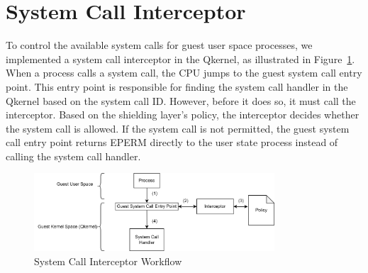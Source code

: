 \section{System Call Interceptor}
\label{sec:design_Interceptor}
To control the available system calls for guest user space processes, we implemented a system call interceptor in the Qkernel, as illustrated in Figure~\ref{fig:syscall_interceptor}. When a process calls a system call, the CPU jumps to the guest system call entry point. 
This entry point is responsible for finding the system call handler in the Qkernel based on the system call ID. However, before it does so, it must call the interceptor. Based on the shielding layer's policy, the interceptor decides whether the 
system call is allowed. If the system call is not permitted, the guest system call entry point returns EPERM directly to the user state process instead of calling the system call handler.

\begin{figure}[htp]
    \centering
    \includegraphics[width=0.8\textwidth]{images/syscall_interceptor.png}
    \caption[System Call Interceptor Workflow]{System Call Interceptor Workflow}
    \label{fig:syscall_interceptor}
\end{figure}

